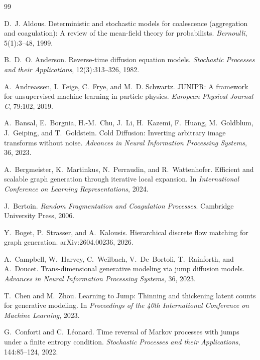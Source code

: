 \documentclass[10pt]{article}
\theoremstyle{definition}
\theoremstyle{remark}
\begin{document}
\begin{thebibliography}{99}

D.~J. Aldous.
\newblock Deterministic and stochastic models for coalescence (aggregation and coagulation): A review of the mean-field theory for probabilists.
\newblock \emph{Bernoulli}, 5(1):3--48, 1999.

B.~D.~O. Anderson.
\newblock Reverse-time diffusion equation models.
\newblock \emph{Stochastic Processes and their Applications}, 12(3):313--326, 1982.

A.~Andreassen, I.~Feige, C.~Frye, and M.~D. Schwartz.
\newblock JUNIPR: A framework for unsupervised machine learning in particle physics.
\newblock \emph{European Physical Journal C}, 79:102, 2019.

A.~Bansal, E.~Borgnia, H.-M.~Chu, J.~Li, H.~Kazemi, F.~Huang, M.~Goldblum, J.~Geiping, and T.~Goldstein.
\newblock Cold Diffusion: Inverting arbitrary image transforms without noise.
\newblock \emph{Advances in Neural Information Processing Systems}, 36, 2023.

A.~Bergmeister, K.~Martinkus, N.~Perraudin, and R.~Wattenhofer.
\newblock Efficient and scalable graph generation through iterative local expansion.
\newblock In \emph{International Conference on Learning Representations}, 2024.

J.~Bertoin.
\newblock \emph{Random Fragmentation and Coagulation Processes}.
\newblock Cambridge University Press, 2006.

Y.~Boget, P.~Strasser, and A.~Kalousis.
\newblock Hierarchical discrete flow matching for graph generation.
\newblock arXiv:2604.00236, 2026.

A.~Campbell, W.~Harvey, C.~Weilbach, V.~De~Bortoli, T.~Rainforth, and A.~Doucet.
\newblock Trans-dimensional generative modeling via jump diffusion models.
\newblock \emph{Advances in Neural Information Processing Systems}, 36, 2023.

T.~Chen and M.~Zhou.
\newblock Learning to Jump: Thinning and thickening latent counts for generative modeling.
\newblock In \emph{Proceedings of the 40th International Conference on Machine Learning}, 2023.

G.~Conforti and C.~L\'eonard.
\newblock Time reversal of Markov processes with jumps under a finite entropy condition.
\newblock \emph{Stochastic Processes and their Applications}, 144:85--124, 2022.


\end{thebibliography}
\end{document}
